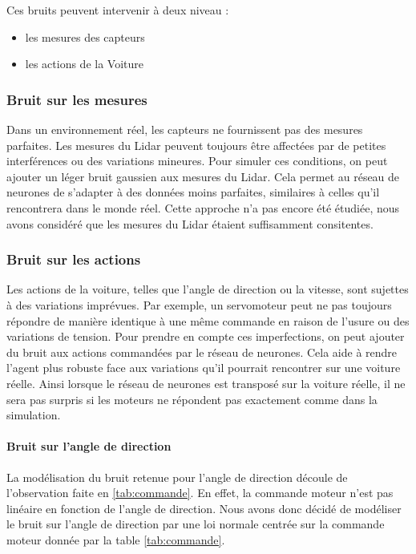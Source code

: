\documentclass[french]{article}
\begin{document}
Ces bruits peuvent intervenir à deux niveau :
\begin{itemize}
    \item les mesures des capteurs 
    \item les actions de la Voiture
\end{itemize}

\subsubsection{Bruit sur les mesures}
Dans un environnement réel, les capteurs ne fournissent pas des mesures parfaites. Les mesures du Lidar peuvent 
toujours être affectées par de petites interférences ou des variations mineures. Pour simuler ces conditions, 
on peut ajouter un léger bruit gaussien aux mesures du Lidar. Cela permet au réseau de neurones de s'adapter 
à des données moins parfaites, similaires à celles qu'il rencontrera dans le monde réel. Cette approche n'a pas encore été étudiée, nous avons considéré que les mesures du Lidar étaient suffisamment consitentes.


\subsubsection{Bruit sur les actions}

Les actions de la voiture, telles que l'angle de direction ou la vitesse, sont sujettes à des 
variations imprévues. Par exemple, un servomoteur peut ne pas toujours répondre de manière identique à une même 
commande en raison de l'usure ou des variations de tension. Pour prendre en compte ces imperfections, on peut 
ajouter du bruit aux actions commandées par le réseau de neurones. Cela aide à rendre l'agent plus robuste face 
aux variations qu'il pourrait rencontrer sur une voiture réelle. Ainsi lorsque le réseau de neurones est transposé sur la voiture réelle, il ne sera pas surpris si les moteurs ne répondent pas exactement comme dans la simulation.

\vspace{0.5cm}

\paragraph{Bruit sur l'angle de direction}
La modélisation du bruit retenue pour l'angle de direction découle de l'observation faite en \ref{tab:commande}. En effet, la commande moteur n'est pas linéaire en fonction de l'angle de direction. Nous avons donc décidé de modéliser le bruit sur l'angle de direction par une loi normale centrée sur la commande moteur donnée par la table \ref{tab:commande}.
\end{document}
